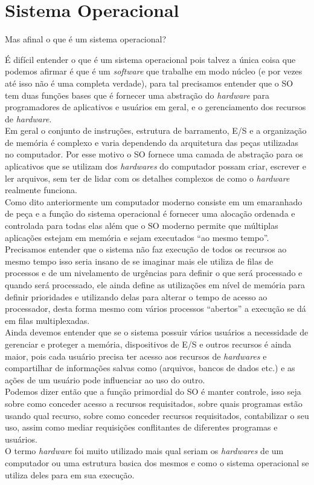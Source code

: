 \chapter[Sistema Operacional]{Sistema Operacional}

Mas afinal o que é um sistema operacional?

É difícil entender o que é um sistema operacional pois talvez a única coisa que podemos afirmar é que é um \emph{software} que trabalhe em modo núcleo (e por vezes até isso não é uma completa verdade), para tal precisamos entender que o SO tem duas funções bases que é fornecer uma abstração do \emph{hardware} para programadores de aplicativos e usuários em geral, e o gerenciamento dos recursos de \emph{hardware}.\\
 Em geral o conjunto de instruções, estrutura de barramento, E/S e a organização de memória é complexo e varia dependendo da arquitetura das peças utilizadas no computador. Por esse motivo o SO fornece uma camada de abstração para os aplicativos que se utilizam dos \emph{hardwares} do computador possam criar, escrever e ler arquivos, sem ter de lidar com os detalhes complexos de como o \emph{hardware} realmente funciona.\\
Como dito anteriormente um computador moderno consiste em um emaranhado de peça e a função do sistema operacional é fornecer uma alocação ordenada e controlada para todas elas além que o SO moderno permite que múltiplas aplicações estejam em memória e sejam executados “ao mesmo tempo”. \\
Precisamos entender que o sistema não faz  execução de todos os recursos ao mesmo tempo isso seria insano de se imaginar mais ele utiliza de filas de processos e de um nivelamento de urgências para definir o que será processado e quando será processado, ele ainda define as utilizações em nível de memória para definir prioridades e utilizando delas para alterar o tempo  de acesso ao processador, desta forma mesmo com vários processos “abertos” a execução se dá em filas multiplexadas.\\
Ainda devemos entender que se o sistema possuir vários usuários a necessidade de gerenciar e proteger a memória, dispositivos de E/S e outros recursos é ainda maior, pois cada usuário precisa ter acesso aos recursos de \emph{hardwares} e compartilhar de informações salvas como (arquivos, bancos de dados etc.) e as ações de um usuário pode influenciar ao uso do outro. \\
Podemos dizer então que a função primordial do SO é manter controle, isso seja sobre como conceder acesso a recursos requisitados, sobre quais programas estão usando qual recurso, sobre como conceder recursos requisitados, contabilizar o seu uso, assim como mediar requisições conflitantes de diferentes programas e usuários.\\
O termo \emph{hardware} foi muito utilizado mais qual seriam os \emph{hardwares} de um computador ou uma estrutura basica dos mesmos e como o sistema operacional se utiliza deles para em sua execução. 

